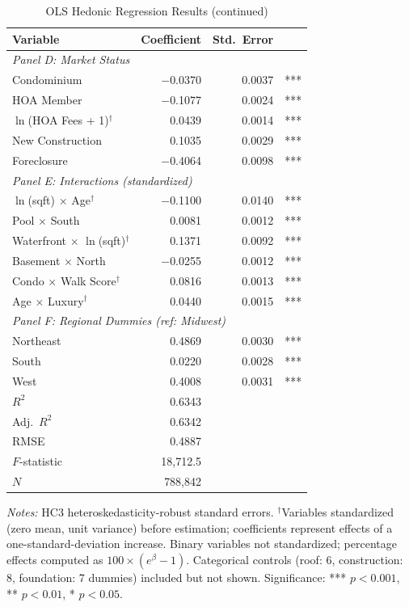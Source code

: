 \begin{table}[H]
\ContinuedFloat
\centering
\caption{OLS Hedonic Regression Results (continued)}
\begin{threeparttable}
\footnotesize
\renewcommand{\arraystretch}{0.92}
\begin{tabular}{lrrl}
\toprule
Variable & Coefficient & Std.\ Error & \\
\midrule
\multicolumn{4}{l}{\textit{Panel D: Market Status}} \\
Condominium & $-$0.0370 & 0.0037 & *** \\
HOA Member & $-$0.1077 & 0.0024 & *** \\
$\ln$(HOA Fees + 1)$^\dagger$ & 0.0439 & 0.0014 & *** \\
New Construction & 0.1035 & 0.0029 & *** \\
Foreclosure & $-$0.4064 & 0.0098 & *** \\
\midrule
\multicolumn{4}{l}{\textit{Panel E: Interactions (standardized)}} \\
$\ln$(sqft) $\times$ Age$^\dagger$ & $-$0.1100 & 0.0140 & *** \\
Pool $\times$ South & 0.0081 & 0.0012 & *** \\
Waterfront $\times$ $\ln$(sqft)$^\dagger$ & 0.1371 & 0.0092 & *** \\
Basement $\times$ North & $-$0.0255 & 0.0012 & *** \\
Condo $\times$ Walk Score$^\dagger$ & 0.0816 & 0.0013 & *** \\
Age $\times$ Luxury$^\dagger$ & 0.0440 & 0.0015 & *** \\
\midrule
\multicolumn{4}{l}{\textit{Panel F: Regional Dummies (ref: Midwest)}} \\
Northeast & 0.4869 & 0.0030 & *** \\
South & 0.0220 & 0.0028 & *** \\
West & 0.4008 & 0.0031 & *** \\
\midrule
$R^2$ & 0.6343 & & \\
Adj.\ $R^2$ & 0.6342 & & \\
RMSE & 0.4887 & & \\
$F$-statistic & 18,712.5 & & \\
$N$ & 788,842 & & \\
\bottomrule
\end{tabular}
\begin{tablenotes}
\small
\item \textit{Notes:} HC3 heteroskedasticity-robust standard errors. $^\dagger$Variables standardized (zero mean, unit variance) before estimation; coefficients represent effects of a one-standard-deviation increase. Binary variables not standardized; percentage effects computed as $100 \times (e^\beta - 1)$. Categorical controls (roof: 6, construction: 8, foundation: 7 dummies) included but not shown. Significance: *** $p<0.001$, ** $p<0.01$, * $p<0.05$.
\end{tablenotes}
\end{threeparttable}
\end{table}

